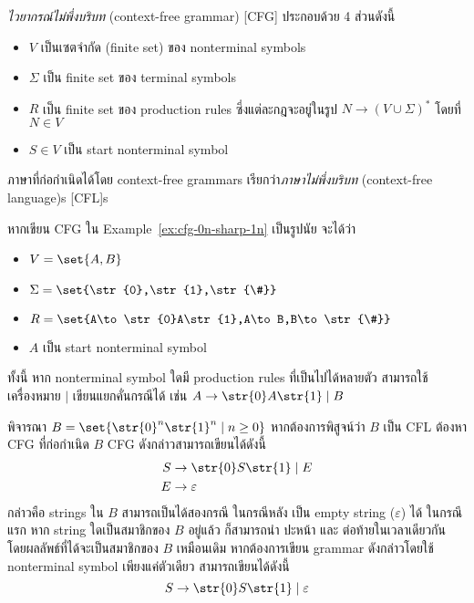 \begin{definition}
\emph{ไวยากรณ์ไม่พึ่งบริบท} (context-free grammar) [CFG] ประกอบด้วย 4 ส่วนดังนี้
\begin{itemize}
\item $V$ เป็นเซตจำกัด (finite set) ของ nonterminal symbols
\item $\Sigma$ เป็น finite set ของ terminal symbols
\item $R$ เป็น finite set ของ production rules ซึ่งแต่ละกฎจะอยู่ในรูป $N\to(V\cup\Sigma)^*$ โดยที่ $N\in V$
\item $S\in V$ เป็น start nonterminal symbol
\end{itemize}

ภาษาที่ก่อกำเนิดได้โดย context-free grammars เรียกว่า\emph{ภาษาไม่พึ่งบริบท} (context-free language)s [CFL]s
\end{definition}
%
\begin{example}
หากเขียน CFG ใน Example~\ref{ex:cfg-0n-sharp-1n} เป็นรูปนัย จะได้ว่า
\begin{itemize}
\item $V=\set{A,B}$
\item $\Sigma=\set{\str{0},\str{1},\str{\#}}$
\item $R=\set{A\to\str{0}A\str{1},A\to B,B\to\str{\#}}$
\item $A$ เป็น start nonterminal symbol
\end{itemize}
\end{example}

ทั้งนี้ หาก nonterminal symbol ใดมี production rules ที่เป็นไปได้หลายตัว สามารถใช้เครื่องหมาย $\mid$ เขียนแยกคั่นกรณีได้ เช่น $A\to\str{0}A\str{1}\mid B$

\begin{example}
พิจารณา $B=\set{\str{0}^n\str{1}^n\mid n\geq 0}$ \enskip หากต้องการพิสูจน์ว่า $B$ เป็น CFL ต้องหา CFG ที่ก่อกำเนิด $B$ \enskip CFG ดังกล่าวสามารถเขียนได้ดังนี้
\begin{align*}
S &\to \str{0}S\str{1} \mid E \\
E &\to \varepsilon
\end{align*}
กล่าวคือ strings ใน $B$ สามารถเป็นได้สองกรณี ในกรณีหลัง เป็น empty string ($\varepsilon$) ได้ ในกรณีแรก หาก string ใดเป็นสมาชิกของ $B$ อยู่แล้ว ก็สามารถนำ  ปะหน้า และ  ต่อท้ายในเวลาเดียวกัน โดยผลลัพธ์ที่ได้จะเป็นสมาชิกของ $B$ เหมือนเดิม \enskip หากต้องการเขียน grammar ดังกล่าวโดยใช้ nonterminal symbol เพียงแค่ตัวเดียว สามารถเขียนได้ดังนี้
\[S \to \str{0}S\str{1} \mid \varepsilon\]
\end{example}

